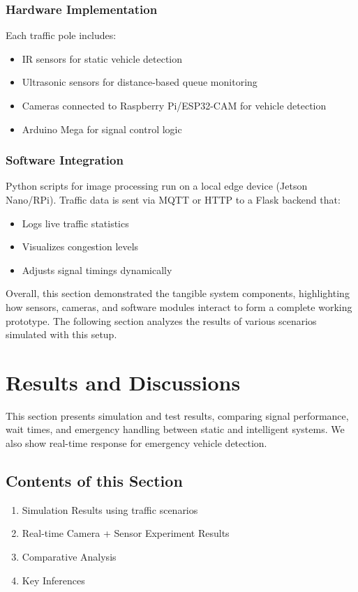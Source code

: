\documentclass[12pt]{report}
\begin{document}
\subsection{Hardware Implementation}
Each traffic pole includes:
\begin{itemize}
\item IR sensors for static vehicle detection
\item Ultrasonic sensors for distance-based queue monitoring
\item Cameras connected to Raspberry Pi/ESP32-CAM for vehicle detection
\item Arduino Mega for signal control logic
\end{itemize}

\subsection{Software Integration}
Python scripts for image processing run on a local edge device (Jetson Nano/RPi). Traffic data is sent via MQTT or HTTP to a Flask backend that:
\begin{itemize}
\item Logs live traffic statistics
\item Visualizes congestion levels
\item Adjusts signal timings dynamically
\end{itemize}

\vspace{0.5cm}

Overall, this section demonstrated the tangible system components, highlighting how sensors, cameras, and software modules interact to form a complete working prototype. The following section analyzes the results of various scenarios simulated with this setup.

\chapter{Results and Discussions}

This section presents simulation and test results, comparing signal performance, wait times, and emergency handling between static and intelligent systems. We also show real-time response for emergency vehicle detection.

\section{Contents of this Section}
\begin{enumerate}
\item Simulation Results using traffic scenarios
\item Real-time Camera + Sensor Experiment Results
\item Comparative Analysis
\item Key Inferences
\end{enumerate}
\end{document}
